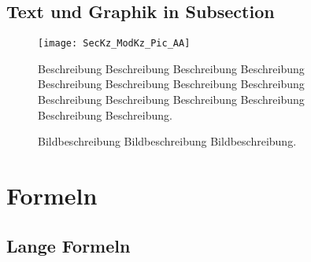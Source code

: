 \documentclass[a4paper, 12pt, xcolor=dvipsnames]{scrartcl}	%
\begin{document}
\subsection{Text und Graphik in Subsection}
\begin{figure}[h!]
    	\begin{minipage}{0.6\textwidth}
		\begin {center}
		\vspace{0.0cm}
		\centering
		\hspace{-1.0cm}\texttt{[image: SecKz\_ModKz\_Pic\_AA]}		
		\end {center}
    \end{minipage}%
    \begin{minipage}{0.4\textwidth}
		\linespread {1.25}
		Beschreibung Beschreibung Beschreibung Beschreibung Beschreibung Beschreibung Beschreibung Beschreibung Beschreibung Beschreibung Beschreibung Beschreibung Beschreibung Beschreibung.\\
     		\caption{Bildbeschreibung Bildbeschreibung Bildbeschreibung.}
		\label{fig:SecKz_ModKz_Pic_BB}
    \end{minipage}
\end{figure}
\pagebreak

%
%
\section{Formeln}
%
%
\subsection{Lange Formeln}

\lipsum[1-2]\\
\end{document}
